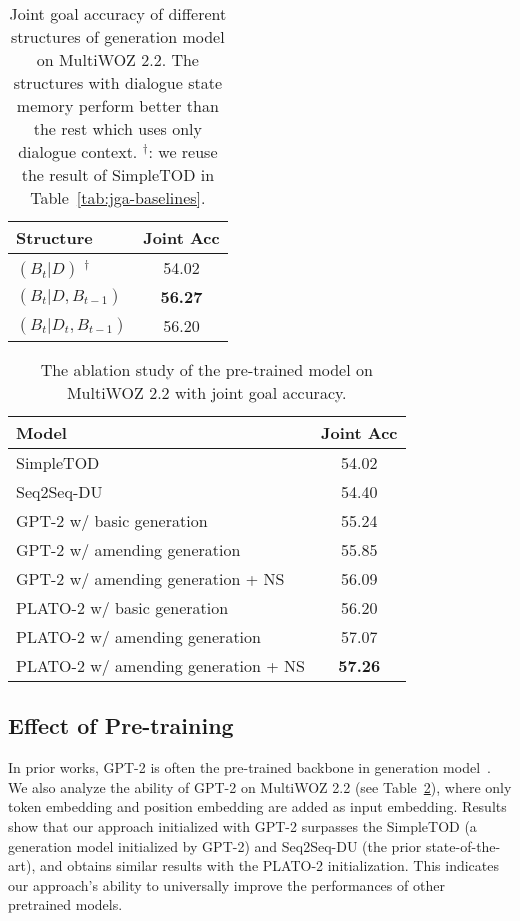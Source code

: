 \documentclass[11pt]{article}
\begin{document}
\begin{table}
\centering
\begin{tabular}{lc}
\hline
\textbf{Structure} & \textbf{Joint Acc} \\
\hline
\hline
$(B_t|D)$ $^\dagger$ & 54.02 \\
$(B_t|D,B_{t-1})$ & \textbf{56.27} \\
$(B_t|D_t,B_{t-1})$ & 56.20 \\
\hline
\end{tabular}
\caption{Joint goal accuracy of different structures of generation model on MultiWOZ 2.2. The structures with dialogue state memory perform better than the rest which uses only dialogue context. $^\dagger$: we reuse the result of SimpleTOD in Table~\ref{tab:jga-baselines}.}\label{tab:structures}
\end{table}

\begin{table}
\centering
\small
\begin{tabular}{lc}
\hline
\textbf{Model} & \textbf{Joint Acc} \\
\hline
\hline
SimpleTOD & 54.02 \\
Seq2Seq-DU & 54.40 \\
\hline
GPT-2 w/ basic generation & 55.24 \\
GPT-2 w/ amending generation & 55.85 \\
GPT-2 w/ amending generation + NS & 56.09 \\
\hline
PLATO-2 w/ basic generation & 56.20 \\
PLATO-2 w/ amending generation & 57.07 \\
PLATO-2 w/ amending generation + NS & \textbf{57.26} \\
\hline
\end{tabular}
\caption{The ablation study of the pre-trained model on MultiWOZ 2.2 with joint goal accuracy.}\label{tab:ablation-pretrain}
\end{table}

\subsection{Effect of Pre-training}
In prior works, GPT-2 is often the pre-trained backbone in generation model~\citep{NEURIPS2020_e9462095,ham-etal-2020-end,yang2021ubar}. We also analyze the ability of GPT-2 on MultiWOZ 2.2 (see Table~\ref{tab:ablation-pretrain}), where only token embedding and position embedding are added as input embedding. Results show that our approach initialized with GPT-2 surpasses the SimpleTOD (a generation model initialized by GPT-2) and Seq2Seq-DU (the prior state-of-the-art), and obtains similar results with the PLATO-2 initialization. This indicates our approach's ability to universally improve the performances of other pretrained models.
\end{document}
